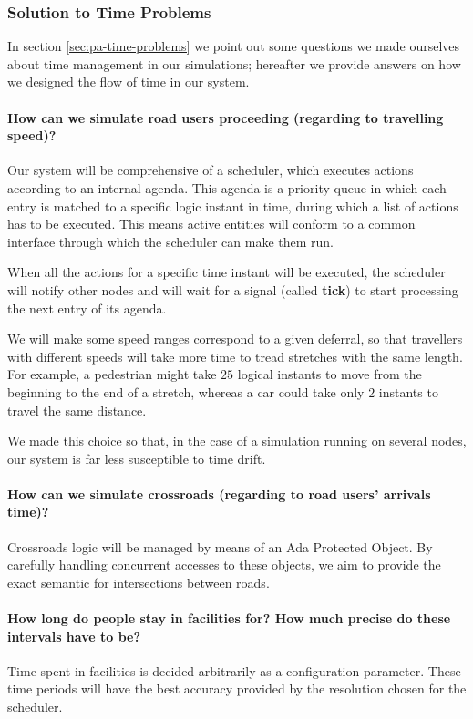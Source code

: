 \subsubsection{Solution to Time Problems}

In section \ref{sec:pa-time-problems} we point out some questions we made
ourselves about time management in our simulations; hereafter we provide
answers on how we designed the flow of time in our system.

\paragraph{How can we simulate road users proceeding (regarding to travelling
  speed)?}
Our system will be comprehensive of a scheduler, which executes actions
according to an internal agenda.
This agenda is a priority queue in which each entry is matched to a specific
logic instant in time, during which a list of actions has to be executed. This
means active entities will conform to a common interface through which the
scheduler can make them run.

When all the actions for a specific time instant will be executed, the
scheduler will notify other nodes and will wait for a signal (called
\textbf{tick}) to start processing the next entry of its agenda.


We will make some speed ranges correspond to a given deferral, so that
travellers with different speeds will take more time to tread stretches with
the same length. For example, a pedestrian might take $25$ logical instants to
move from the beginning to the end of a stretch, whereas a car could take only
$2$ instants to travel the same distance.

We made this choice so that, in the case of a simulation running on several
nodes, our system is far less susceptible to time drift.

\paragraph{How can we simulate crossroads (regarding to road users' arrivals
  time)?}
Crossroads logic will be managed by means of an Ada Protected Object. By
carefully handling concurrent accesses to these objects, we aim to provide the
exact semantic for intersections between roads.

\paragraph{How long do people stay in facilities for? How much precise do these
  intervals have to be?}
Time spent in facilities is decided arbitrarily as a configuration parameter.
These time periods will have the best accuracy provided by the resolution
chosen for the scheduler.

